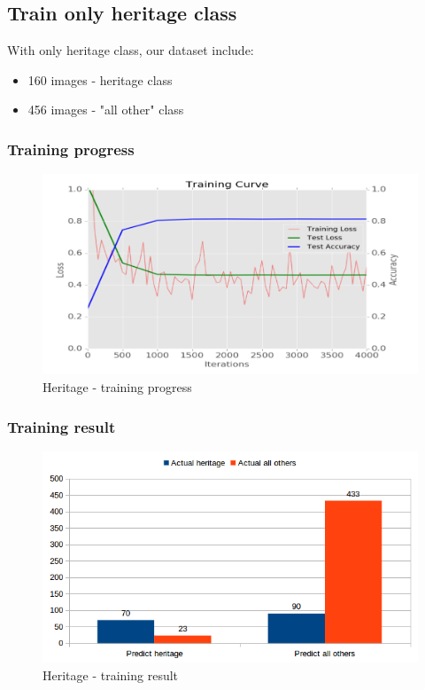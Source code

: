 \documentclass[11pt]{article}
\begin{document}
\subsection{Train only heritage class}
With only heritage class, our dataset include: 
\begin{itemize}
\item 160 images - heritage class
\item 456 images - "all other" class
\end{itemize}

\subsubsection{Training progress}

\begin{figure}[H]
\centering
\includegraphics[width=1\textwidth]{images/train_only_heritage}
\caption{Heritage - training progress}
\end{figure}

\subsubsection{Training result}

\begin{figure}[H]
\centering
\includegraphics[width=1\textwidth]{images/heritage}
\caption{Heritage - training result}
\end{figure}
\end{document}
